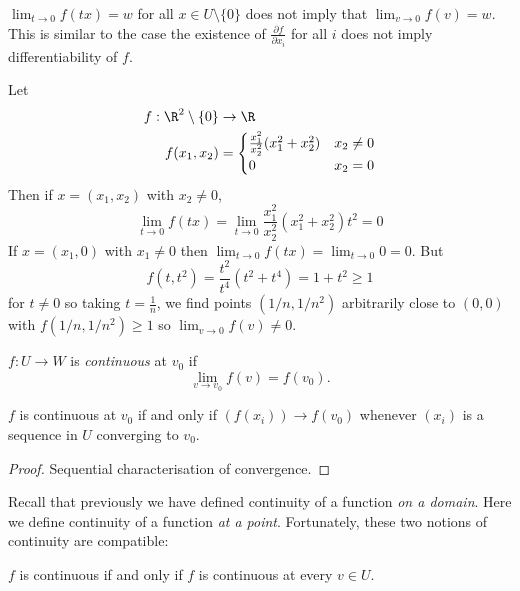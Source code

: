 \documentclass[a4paper]{article}
\theoremstyle{definition}
\begin{document}
\begin{note}
  \(\lim_{t \to 0} f(t x) = w\) for all \( x \in U\setminus \{0\}\) does not imply that \(\lim_{v \to 0} f(v) = w\). This is similar to the case the existence of \(\frac{\partial f}{\partial x_i}\) for all \(i\) does not imply differentiability of \(f\).
\end{note}

\begin{eg}
  Let
  \begin{align*}
    f: \R^2\setminus\{0\} &\to \R \\
    f(x_1, x_2) &=
                  \begin{cases}
                    \frac{x_1^2}{x_2^2}(x_1^2 + x_2^2) & x_2 \neq 0 \\
                    0 & x_2 = 0
                  \end{cases}
  \end{align*}
  Then if \(x = (x_1, x_2)\) with \(x_2 \neq 0\),
  \[
    \lim_{t \to 0} f(t x) = \lim_{t \to 0} \frac{x_1^2}{x_2^2}(x_1^2 + x_2^2) t^2 = 0
  \]
  If \(x = (x_1, 0)\) with \(x_1 \neq 0\) then \(\lim_{t \to 0} f(t x) = \lim_{t \to 0} 0 = 0\). But
  \[
    f(t, t^2) = \frac{t^2}{t^4}(t^2 + t^4) = 1 + t^2 \geq 1
  \]
  for \(t \neq 0\) so taking \(t = \frac{1}{n}\), we find points \((1/n, 1/n^2)\) arbitrarily close to \((0, 0)\) with \(f(1/n, 1/n^2) \geq 1\) so \(\lim_{v \to 0} f(v) \neq 0\).
\end{eg}

\begin{definition}[Continuity]
  \(f: U \to W\) is \emph{continuous} at \(v_0\) if
  \[
    \lim_{v \to v_0} f(v) = f(v_0).
  \]
\end{definition}

\begin{lemma}
  \(f\) is continuous at \(v_0\) if and only if \((f(x_i)) \to f(v_0)\) whenever \((x_i)\) is a sequence in \(U\) converging to \(v_0\).
\end{lemma}

\begin{proof}
  Sequential characterisation of convergence.
\end{proof}

Recall that previously we have defined continuity of a function \emph{on a domain}. Here we define continuity of a function \emph{at a point}. Fortunately, these two notions of continuity are compatible:

\begin{corollary}
  \(f\) is continuous if and only if \(f\) is continuous at every \(v \in U\).
\end{corollary}
\end{document}
